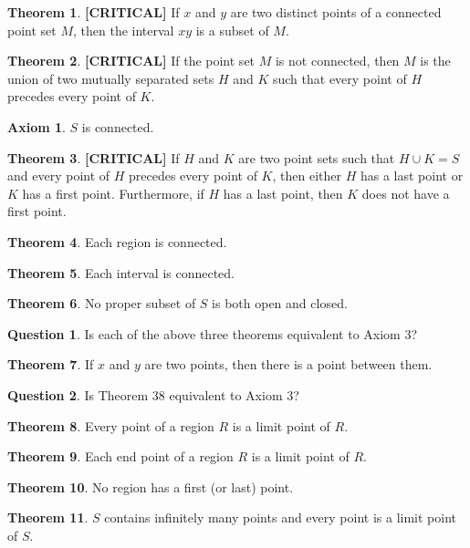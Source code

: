 \documentclass{article}
\theoremstyle{definition}
\newtheorem{question}{Question}
\newtheorem{axiom}{Axiom}
\newtheorem{theorem}{Theorem}
\theoremstyle{definition}
\theoremstyle{plain}
\begin{document}
\begin{theorem}
  \textbf{[CRITICAL]} If $x$ and $y$ are two distinct points of a connected
  point set $M$, then the interval $xy$ is a subset of $M$.
\end{theorem}

\begin{theorem}
  \textbf{[CRITICAL]} If the point set $M$ is not connected, then $M$ is the
  union of two mutually separated sets $H$ and $K$ such that every point of $H$
  precedes every point of $K$.
\end{theorem}

\begin{axiom}
  \label{ax:connected}
  $S$ is connected.
\end{axiom}

\begin{theorem}
  \textbf{[CRITICAL]} If $H$ and $K$ are two point sets such that \mbox{$H \cup K =
  S$} and every point of $H$ precedes every point of $K$, then either $H$ has a
  last point or $K$ has a first point.  Furthermore, if $H$ has a last point,
  then $K$ does not have a first point.
\end{theorem}

\begin{theorem}
  Each region is connected.
\end{theorem}

\begin{theorem}
  Each interval is connected.
\end{theorem}

\begin{theorem}
  No proper subset of $S$ is both open and closed.
\end{theorem}

\begin{question}
  Is each of the above three theorems equivalent to Axiom 3?
\end{question}

\begin{theorem}
  If $x$ and $y$ are two points, then there is a point between them.
\end{theorem}

\begin{question}
  Is Theorem 38 equivalent to Axiom 3?
\end{question}

\begin{theorem}
  Every point of a region $R$ is a limit point of $R$.
\end{theorem}

\begin{theorem}
  Each end point of a region $R$ is a limit point of $R$.
\end{theorem}

\begin{theorem}
  No region has a first (or last) point.
\end{theorem}

\begin{theorem}
  $S$ contains infinitely many points and every point is a limit point of $S$.
\end{theorem}
\end{document}
